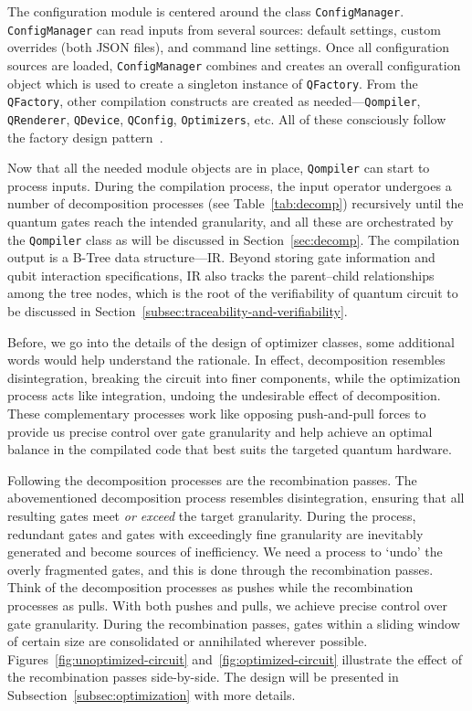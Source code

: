\documentclass[a4paper,titlepage]{article}
\begin{document}
    The configuration module is centered around the class \texttt{ConfigManager}.
    \texttt{ConfigManager} can read inputs from several sources: default settings, custom overrides (both JSON files),
    and command line settings.
    Once all configuration sources are loaded, \texttt{ConfigManager} combines and creates an overall configuration object
    which is used to create a singleton instance of \texttt{QFactory}.
    From the \texttt{QFactory}, other compilation constructs are created as
    needed---\texttt{Qompiler}, \texttt{QRenderer}, \texttt{QDevice}, \texttt{QConfig}, \texttt{Optimizers}, etc.
    All of these consciously follow the factory design pattern~\cite{Gamma1994DesignPattern}.


    Now that all the needed module objects are in place, \texttt{Qompiler} can start to process inputs.
    During the compilation process, the input operator undergoes a number of decomposition processes (see Table~\ref{tab:decomp}) recursively
    until the quantum gates reach the intended granularity, and all these are orchestrated by the \texttt{Qompiler} class
    as will be discussed in Section~\ref{sec:decomp}.
    The compilation output is a B-Tree data structure---IR\@.
    Beyond storing gate information and qubit interaction specifications,
    IR also tracks the parent--child relationships among the tree nodes, which is the root of
    the verifiability of quantum circuit to be discussed in Section~\ref{subsec:traceability-and-verifiability}.


    Before, we go into the details of the design of optimizer classes, some additional words would help understand the rationale.
    In effect, decomposition resembles disintegration, breaking the circuit into finer components,
    while the optimization process acts like integration, undoing the undesirable effect of decomposition.
    These complementary processes work like opposing push-and-pull forces to provide us precise control over gate granularity
    and help achieve an optimal balance in the compilated code that best suits the targeted quantum hardware.

    Following the decomposition processes are the recombination passes.
    The abovementioned decomposition process resembles disintegration, ensuring that all resulting gates meet \emph{or exceed} the target granularity.
    During the process, redundant gates and gates with exceedingly fine granularity are inevitably generated and become sources of inefficiency.
    We need a process to `undo' the overly fragmented gates, and this is done through the recombination passes.
    Think of the decomposition processes as pushes while the recombination processes as pulls.
    With both pushes and pulls, we achieve precise control over gate granularity.
    During the recombination passes, gates within a sliding window of certain size are consolidated or annihilated wherever possible.
    Figures~\ref{fig:unoptimized-circuit} and~\ref{fig:optimized-circuit} illustrate the effect of the recombination passes side-by-side.
    The design will be presented in Subsection~\ref{subsec:optimization} with more details.
\end{document}
